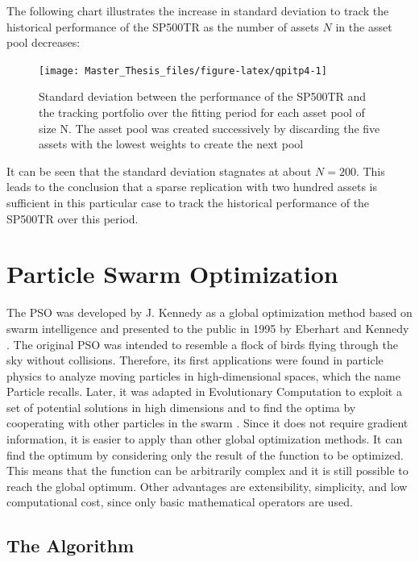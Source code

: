 \documentclass[
  oneside, a4paper, 12pt, openany]{book}
\theoremstyle{definition}
\theoremstyle{definition}
\theoremstyle{definition}
\theoremstyle{definition}
\theoremstyle{remark}
\begin{document}
\normalsize\vspace{0.1cm}

The following chart illustrates the increase in standard deviation to track the historical performance of the SP500TR as the number of assets \(N\) in the asset pool decreases:

\begin{figure}[H]
\texttt{[image: Master\_Thesis\_files/figure-latex/qpitp4-1]} \caption{Standard deviation between the performance of the SP500TR and the tracking portfolio over the fitting period for each asset pool of size N. The asset pool was created successively by discarding the five assets with the lowest weights to create the next pool}\label{fig:qpitp4}
\end{figure}

It can be seen that the standard deviation stagnates at about \(N=200\). This leads to the conclusion that a sparse replication with two hundred assets is sufficient in this particular case to track the historical performance of the SP500TR over this period.

\hypertarget{spso}{%
\chapter{Particle Swarm Optimization}\label{spso}}

The PSO was developed by J. Kennedy as a global optimization method based on swarm intelligence and presented to the public in 1995 by Eberhart and Kennedy \citep{KeEb1995}. The original PSO was intended to resemble a flock of birds flying through the sky without collisions. Therefore, its first applications were found in particle physics to analyze moving particles in high-dimensional spaces, which the name Particle recalls. Later, it was adapted in Evolutionary Computation to exploit a set of potential solutions in high dimensions and to find the optima by cooperating with other particles in the swarm \citep{PaVr2002}. Since it does not require gradient information, it is easier to apply than other global optimization methods. It can find the optimum by considering only the result of the function to be optimized. This means that the function can be arbitrarily complex and it is still possible to reach the global optimum. Other advantages are extensibility, simplicity, and low computational cost, since only basic mathematical operators are used.

\hypertarget{the-algorithm}{%
\section{The Algorithm}\label{the-algorithm}}
\end{document}
